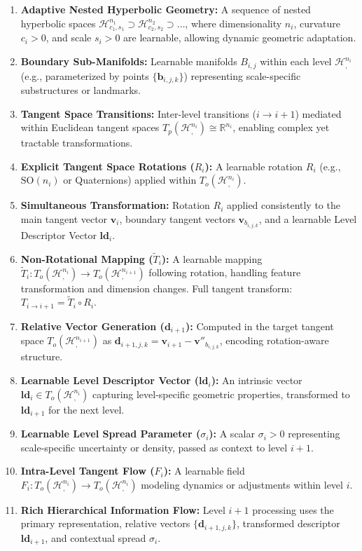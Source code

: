\documentclass[11pt, twoside]{article} %
\newcommand{\HypSpace}[3]{\mathcal{H}^{#1}_{#2, #3}} %
\newcommand{\R}{\mathbb{R}} %
\newcommand{\SO}[1]{\text{SO}(#1)} %
\begin{document}
\begin{enumerate}[label=\arabic*), wide, labelindent=0pt]
    \item \textbf{Adaptive Nested Hyperbolic Geometry:} A sequence of nested hyperbolic spaces $\HypSpace{n_1}{c_1}{s_1} \supset \HypSpace{n_2}{c_2}{s_2} \supset \dots$, where dimensionality $n_i$, curvature $c_i > 0$, and scale $s_i > 0$ are learnable, allowing dynamic geometric adaptation.
    \item \textbf{Boundary Sub-Manifolds:} Learnable manifolds $B_{i,j}$ within each level $\HypSpace{n_i}{}{}$ (e.g., parameterized by points $\{\mathbf{b}_{i,j,k}\}$) representing scale-specific substructures or landmarks.
    \item \textbf{Tangent Space Transitions:} Inter-level transitions ($i \rightarrow i+1$) mediated within Euclidean tangent spaces $T_p(\HypSpace{n_i}{}{}) \cong \R^{n_i}$, enabling complex yet tractable transformations.
    \item \textbf{Explicit Tangent Space Rotations ($R_i$):} A learnable rotation $R_i$ (e.g., $\SO{n_i}$ or Quaternions) applied within $T_o(\HypSpace{n_i}{}{})$.
    \item \textbf{Simultaneous Transformation:} Rotation $R_i$ applied consistently to the main tangent vector $\mathbf{v}_i$, boundary tangent vectors $\mathbf{v}_{b_{i,j,k}}$, and a learnable Level Descriptor Vector $\mathbf{ld}_i$.
    \item \textbf{Non-Rotational Mapping ($\tilde{T}_i$):} A learnable mapping $\tilde{T}_i: T_o(\HypSpace{n_i}{}{}) \rightarrow T_o(\HypSpace{n_{i+1}}{}{})$ following rotation, handling feature transformation and dimension changes. Full tangent transform: $T_{i \rightarrow i+1} = \tilde{T}_i \circ R_i$.
    \item \textbf{Relative Vector Generation ($\mathbf{d}_{i+1}$):} Computed in the target tangent space $T_o(\HypSpace{n_{i+1}}{}{})$ as $\mathbf{d}_{i+1, j, k} = \mathbf{v}_{i+1} - \mathbf{v}''_{b_{i,j,k}}$, encoding rotation-aware structure.
    \item \textbf{Learnable Level Descriptor Vector ($\mathbf{ld}_i$):} An intrinsic vector $\mathbf{ld}_i \in T_o(\HypSpace{n_i}{}{})$ capturing level-specific geometric properties, transformed to $\mathbf{ld}_{i+1}$ for the next level.
    \item \textbf{Learnable Level Spread Parameter ($\sigma_i$):} A scalar $\sigma_i > 0$ representing scale-specific uncertainty or density, passed as context to level $i+1$.
    \item \textbf{Intra-Level Tangent Flow ($F_i$):} A learnable field $F_i: T_o(\HypSpace{n_i}{}{}) \rightarrow T_o(\HypSpace{n_i}{}{})$ modeling dynamics or adjustments within level $i$.
    \item \textbf{Rich Hierarchical Information Flow:} Level $i+1$ processing uses the primary representation, relative vectors $\{\mathbf{d}_{i+1, j, k}\}$, transformed descriptor $\mathbf{ld}_{i+1}$, and contextual spread $\sigma_i$.
\end{enumerate}
\end{document}

